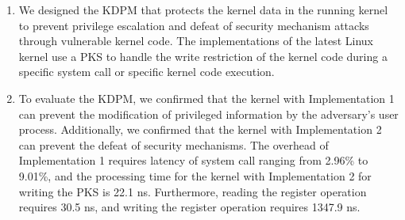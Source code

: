 \begin{enumerate}%
\item We designed the KDPM that protects the kernel data in the running kernel to
prevent privilege escalation and defeat of security mechanism attacks through
vulnerable kernel code.
%
The implementations of the latest Linux kernel use a PKS to handle the write restriction
of the kernel code during a specific system call or specific kernel code execution.

% 


  \item 
To evaluate the KDPM,
we confirmed that the kernel with Implementation 1 can prevent the modification of privileged
information by the adversary's user process. Additionally, we confirmed that the kernel
with Implementation 2 can prevent the defeat of security mechanisms.
%
The overhead of Implementation 1 requires latency of system call ranging from
2.96\% to 9.01\%, 
and the processing time for the kernel with Implementation 2 for writing the PKS
is 22.1 ns. Furthermore, reading the register operation requires 30.5 ns, and
writing the register operation requires 1347.9 ns.


\end{enumerate}
